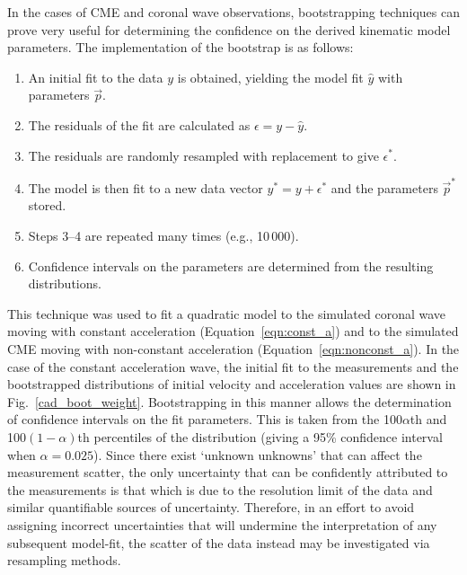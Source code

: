 \documentclass[structabstract]{aa}
\begin{document}
In the cases of CME and coronal wave observations, bootstrapping techniques can prove very useful for determining the confidence on the derived kinematic model parameters. The implementation of the bootstrap is as follows:
\begin{enumerate}
\item An initial fit to the data $y$ is obtained, yielding the model fit $\hat{y}$ with parameters $\vec{p}$.
\item The residuals of the fit are calculated as $\epsilon = y - \hat{y}$.
\item The residuals are randomly resampled with replacement to give $\epsilon^*$.
\item The model is then fit to a new data vector $y^* = y + \epsilon^*$ and the parameters $\vec{p}^*$ stored.
\item Steps 3--4 are repeated many times (e.g., 10\,000).
\item Confidence intervals on the parameters are determined from the resulting distributions.
\end{enumerate}
This technique was used to fit a quadratic model to the simulated coronal wave moving with constant acceleration (Equation~\ref{eqn:const_a}) and to the simulated CME moving with non-constant acceleration (Equation~\ref{eqn:nonconst_a}). In the case of the constant acceleration wave, the initial fit to the measurements and the bootstrapped distributions of initial velocity and acceleration values are shown in Fig.~\ref{cad_boot_weight}. Bootstrapping in this manner allows the determination of confidence intervals on the fit parameters. This is taken from the 100$\alpha$th and 100$\left(1-\alpha\right)$th percentiles of the distribution (giving a 95\% confidence interval when $\alpha=0.025$). Since there exist `unknown unknowns' that can affect the measurement scatter, the only uncertainty that can be confidently attributed to the measurements is that which is due to the resolution limit of the data and similar quantifiable sources of uncertainty. Therefore, in an effort to avoid assigning incorrect uncertainties that will undermine the interpretation of any subsequent model-fit, the scatter of the data instead may be investigated via resampling methods.
\end{document}

